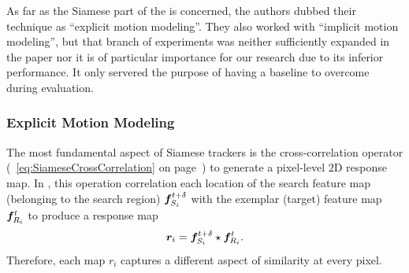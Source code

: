 As far as the Siamese part of the \siammot{} is concerned, the authors dubbed their technique as ``explicit motion modeling''. They also worked with ``implicit motion modeling'', but that branch of experiments was neither sufficiently expanded in the paper nor it is of particular importance for our research due to its inferior performance. It only servered the purpose of having a baseline to overcome during evaluation.

\subsubsection{Explicit Motion Modeling}

The most fundamental aspect of Siamese trackers is the cross-correlation operator (\sectionstr{}~\ref{eq:SiameseCrossCorrelation} on page~\pageref{eq:SiameseCrossCorrelation}) to generate a pixel-level $2$D response map. In \siammot{}, this operation correlation each location of the search feature map (belonging to the search region) $\bm{f}_{S_i}^{t + \delta}$ with the exemplar (target) feature map $\bm{f}_{R_i}^{t}$ to produce a response map
\begin{equation}
    \bm{r}_{i} = \bm{f}_{S_i}^{t + \delta} \star \bm{f}_{R_i}^{t}.
\end{equation}
Therefore, each map $r_i$ captures a different aspect of similarity at every pixel.

